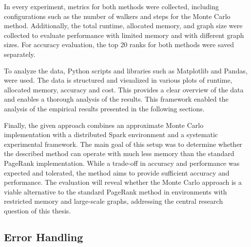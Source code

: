 In every experiment, metrics for both methods were collected, including configurations such as the number of walkers and steps for the Monte Carlo method. Additionally, the total runtime, allocated memory, and graph size were collected to evaluate performance with limited memory and with different graph sizes. For accuracy evaluation, the top 20 ranks for both methods were saved separately. \par
To analyze the data, Python scripts and libraries such as Matplotlib and Pandas, were used. The data is structured and visualized in various plots of runtime, allocated memory, accuracy and cost. This provides a clear overview of the data and enables a thorough analysis of the results. 
This framework enabled the analysis of the empirical results presented in the following sections. \par


Finally, the given approach combines an approximate Monte Carlo implementation with a distributed Spark environment and a systematic experimental framework. The main goal of this setup was to determine whether the described method can operate with much less memory than the standard PageRank implementation. While a trade-off in accuracy and performance was expected and tolerated, the method aims to provide sufficient accuracy and performance. The evaluation will reveal whether the Monte Carlo approach is a viable alternative to the standard PageRank method in environments with restricted memory and large-scale graphs, addressing the central research question of this thesis.


\subsection{Error Handling}

